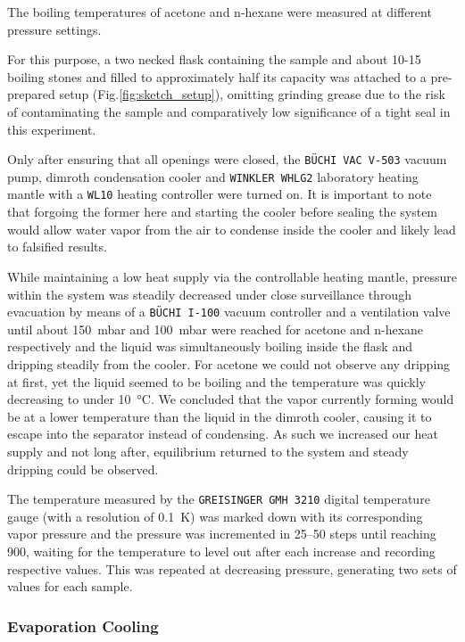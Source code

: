 The boiling temperatures of acetone and n-hexane were measured at different pressure settings. 

For this purpose, a two necked flask containing the sample and about 10-15 boiling stones and filled to approximately half its capacity was attached to a pre-prepared setup (Fig.\ref{fig:sketch_setup}), omitting grinding grease due to the risk of contaminating the sample and comparatively low significance of a tight seal in this experiment.

Only after ensuring that all openings were closed, the \texttt{BÜCHI VAC V-503} vacuum pump, dimroth condensation cooler and \texttt{WINKLER WHLG2} laboratory heating mantle with a \texttt{WL10} heating controller were turned on. It is important to note that forgoing the former here and starting the cooler before sealing the system would allow water vapor from the air to condense inside the cooler and likely lead to falsified results. 

While maintaining a low heat supply via the controllable heating mantle, pressure within the system was steadily decreased under close surveillance through evacuation by means of a \texttt{BÜCHI I-100} vacuum controller and a ventilation valve until about \qty{150}{\milli\bar} and \qty{100}{\milli\bar} were reached for acetone and n-hexane respectively and the liquid was simultaneously boiling inside the flask and dripping steadily from the cooler. For acetone we could not observe any dripping at first, yet the liquid seemed to be boiling and the temperature was quickly decreasing to under \qty{10}{\celsius}. We concluded that the vapor currently forming would be at a lower temperature than the liquid in the dimroth cooler, causing it to escape into the separator instead of condensing. As such we increased our heat supply and not long after, equilibrium returned to the system and steady dripping could be observed. 

The temperature measured by the \texttt{GREISINGER GMH 3210} digital temperature gauge (with a resolution of \qty{0.1}{\kelvin}) was marked down with its corresponding vapor pressure and the pressure was incremented in \qtyrange{25}{50}{\mbar} steps until reaching \qty{900}{\mbar}, waiting for the temperature to level out after each increase and recording respective values. This was repeated at decreasing pressure, generating two sets of values for each sample.


\subsubsection{Evaporation Cooling}

